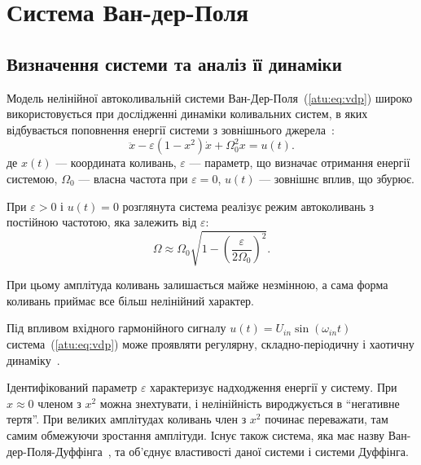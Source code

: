 
\FloatBarrier

\section{Система Ван-дер-Поля} %
\label{atu:sect:vdp}


\subsection{Визначення системи та аналіз її динаміки} %

Модель нелінійної автоколивальній системи
Ван-Дер-Поля~(\ref{atu:eq:vdp}) широко використовується при дослідженні
динаміки коливальних систем, в яких відбувається поповнення
енергії системи з зовнішнього джерела~\cite{Ginoux2012VanDP,anisch_nonlin_eff,magni_theory_dyn_chaos,atu_asau16,atu_st75,chulichkcov_mm_ml_dyn}:
%
\begin{equation}
 \ddot{x} - \varepsilon (1-x^2)  \dot{x} + \Omega_0^2 x  = u(t) .
\label{atu:eq:vdp}
\end{equation}
\noindent
де
\(x(t)\) --- координата коливань,
\(\varepsilon \) --- параметр, що визначає отримання енергії системою,
\(\Omega_0 \) --- власна частота при \(\varepsilon= 0 \),
\( u (t) \) --- зовнішнє вплив, що збурює.

При \(\varepsilon> 0 \) і \(u (t) = 0 \) розглянута система реалізує режим
автоколивань з постійною частотою, яка залежить від \(\varepsilon \):
%
\begin{equation}
\Omega \approx \Omega_0 \sqrt{ 1 - \left( \frac{\varepsilon}{2 \Omega_0} \right)^2 }.
\label{atu:eq:vdp_Omega}
\end{equation}

При цьому амплітуда коливань залишається майже незмінною, а
сама форма коливань приймає все більш нелінійний характер.

Під впливом вхідного гармонійного сигналу
\( u(t) = U_{in} \sin ( \omega_{in} t ) \)
система~(\ref{atu:eq:vdp}) може проявляти регулярну, складно-періодичну
і хаотичну динаміку~\cite{atu_itcs2011,atu_ISDMCI2011,gang_chaos_on_phase_noise,baranov_chaos_vdp,kuznetsov_phenomen_vdp,math5040070}.

Ідентифікований параметр \(\varepsilon \) характеризує надходження
енергії у систему. При
$ x \approx 0 $ членом з
$ x ^ 2 $ можна знехтувати, і нелінійність вироджується в ``негативне тертя''.
При великих амплітудах коливань член з
$x^2$ починає переважати, там самим обмежуючи зростання
амплітуди. Існує також система, яка має назву
Ван-дер-Поля-Дуффінга~\cite{landa_nonlin_vivro_waves}, та об'єднує властивості
даної системи і системи Дуффінга.

